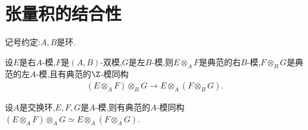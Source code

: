 \section{张量积的结合性}

记号约定:$A,B$是环.

\begin{proposition}{}{}
	设$E$是右$A$-模,$F$是$\left(A,B\right)$-双模,$G$是左$B$-模,则$E\otimes_{A}F$是典范的右$B$-模,$F\otimes_{B}G$是典范的左$A$-模,且有典范的$\Z$-模同构
	\begin{align*}
		\left(E\otimes_{A}F\right)\otimes_{B}G\to E\otimes_{A}\left(F\otimes_{B}G\right).
	\end{align*}
\end{proposition}

\begin{corollary}{}{}
	设$A$是交换环,$E,F,G$是$A$-模,则有典范的$A$-模同构$\left(E\otimes_{A}F\right)\otimes_{A}G\simeq E\otimes_{A}\left(F\otimes_{A}G\right)$.
\end{corollary}